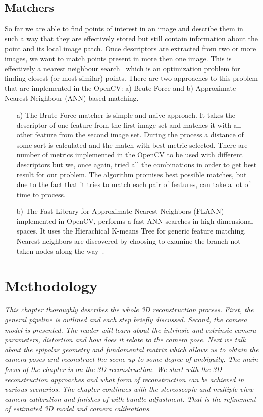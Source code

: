 \section{Matchers}
\label{sec:matchers}
So far we are able to find points of interest in an image and describe them in such a way that they are effectively stored but still contain information about the point and its local image patch. Once descriptors are extracted from two or more images, we want to match points present in more then one image. This is effectively a nearest neighbour search~\cite{nearest_neighbour_search} which is an optimization problem for finding closest (or most similar) points. There are two approaches to this problem that are implemented in the OpenCV: a) Brute-Force and b) Approximate Nearest Neighbour (ANN)-based matching.

\begin{itemize}
	\item[a)] The Brute-Force matcher is simple and naive approach. It takes the descriptor of one feature from the first image set and matches it with all other feature from the second image set. During the process a distance of some sort is calculated and the match with best metric selected. There are number of metrics implemented in the OpenCV to be used with different descriptors but we, once again, tried all the combinations in order to get best result for our problem. The algorithm promises best possible matches, but due to the fact that it tries to match each pair of features, can take a lot of time to process. 

	\item[b)] The Fast Library for Approximate Nearest Neighbors (FLANN) implemented in OpenCV, performs a fast ANN searches in high dimensional spaces. It uses the Hierachical K-means Tree for generic feature matching. Nearest neighbors are discovered by choosing to examine the branch-not-taken nodes along the way~\cite{flann}.
\end{itemize}

\chapter{Methodology}
\label{chapter:methodology}
\textit{This chapter thoroughly describes the whole 3D reconstruction process. First, the general pipeline is outlined and each step briefly discussed. Second, the camera model is presented. The reader will learn about the intrinsic and extrinsic camera parameters, distortion and how does it relate to the camera pose. Next we talk about the epipolar geometry and fundamental matrix which allows us to obtain the camera poses and reconstruct the scene up to some degree of ambiguity. The main focus of the chapter is on the 3D reconstruction. We start with the 3D reconstruction approaches and what form of reconstruction can be achieved in various scenarios. The chapter continues with the stereoscopic and multiple-view camera calibration and finishes of with bundle adjustment. That is the refinement of estimated 3D model and camera calibrations.}

